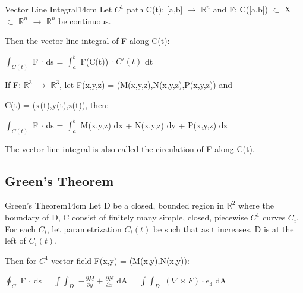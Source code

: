     \begin{wtheorem}{Vector Line Integral}{14cm}
        Let $C^1$ path C(t): [a,b] $\rightarrow$ $\mathbb{R}^n$
        and F: C([a,b]) $\subset$ X $\subset$ $\mathbb{R}^n$ $\rightarrow$
        $\mathbb{R}^n$ be continuous.

        Then the {\color{lblue} vector line integral}
        of F along C(t):

        \hspace{0.5cm}
        $\int_{C(t)}$ F $\cdot$ ds = $\int_a^b$ F(C(t)) $\cdot$ $C'(t)$ dt

        If F: $\mathbb{R}^3$ $\rightarrow$ $\mathbb{R}^3$, let
        F(x,y,z) = (M(x,y,z),N(x,y,z),P(x,y,z)) and

        C(t) = (x(t),y(t),z(t)), then:

        \hspace{0.5cm}
        $\int_{C(t)}$ F $\cdot$ ds
        = $\int_a^b$ M(x,y,z) dx + N(x,y,z) dy + P(x,y,z) dz

        The vector line integral is also called the
        {\color{lblue} circulation of F along C(t)}.
    \end{wtheorem}

    \vspace{0.5cm}





\subsection{ Green's Theorem }

    \begin{wtheorem}{Green's Theorem}{14cm}
        Let D be a closed, bounded region in $\mathbb{R}^2$
        where the boundary of D, C consist of finitely many simple, closed,
        piecewise $C^1$ curves $C_i$.
        For each $C_i$, let parametrization $C_i(t)$ be such that
        as t increases, D is at the left of $C_i(t)$.

        Then for $C^1$ vector field F(x,y) = (M(x,y),N(x,y)):

        \hspace{0.5cm}
        $\oint_C$ F $\cdot$ ds
        = $\int \int_D$ $-\frac{\partial M}{\partial y}
                        + \frac{\partial N}{\partial x}$ dA
        = $\int \int_D$ $(\nabla \times F) \cdot e_3$ dA
    \end{wtheorem}

    \vspace{0.5cm}




